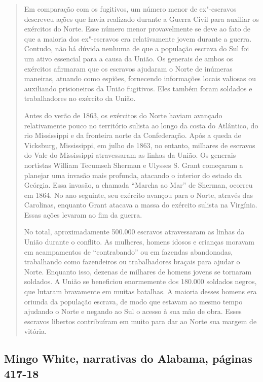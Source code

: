 \begin{quote}
Em comparação com os fugitivos, um número menor de ex"-escravos
descreveu ações que havia realizado durante a Guerra Civil para auxiliar
os exércitos do Norte. Esse número menor provavelmente se deve ao fato
de que a maioria dos ex"-escravos era relativamente jovem durante a
guerra. Contudo, não há dúvida nenhuma de que a população escrava do Sul
foi um ativo essencial para a causa da União. Os generais de ambos os
exércitos afirmaram que os escravos ajudaram o Norte de inúmeras
maneiras, atuando como espiões, fornecendo informações locais valiosas
ou auxiliando prisioneiros da União fugitivos. Eles também foram
soldados e trabalhadores no exército da União.

Antes do verão de 1863, os exércitos do Norte haviam avançado
relativamente pouco no território sulista ao longo da costa do
Atlântico, do rio Mississippi e da fronteira norte da Confederação. Após %
a queda de Vicksburg, Mississippi, em julho de 1863, no entanto, %
milhares de escravos do Vale do Mississippi atravessaram as linhas da %
União. Os generais nortistas William Tecumseh Sherman e Ulysses S. Grant
começaram a planejar uma invasão mais profunda, atacando o interior do
estado da Geórgia. Essa invasão, a chamada ``Marcha ao Mar'' de Sherman,
ocorreu em 1864. No ano seguinte, seu exército avançou para o Norte,
através das Carolinas, enquanto Grant atacava a massa do exército
sulista na Virgínia. Essas ações levaram ao fim da guerra.

No total, aproximadamente 500.000 escravos atravessaram as linhas
da União durante o conflito. As mulheres, homens idosos e crianças
moravam em acampamentos de ``contrabando'' ou em fazendas abandonadas,
trabalhando como fazendeiros ou trabalhadores braçais para ajudar o
Norte. Enquanto isso, dezenas de milhares de homens jovens se tornaram
soldados. A União se beneficiou enormemente dos 180.000 soldados negros,
que lutaram bravamente em muitas batalhas. A maioria desses homens era
oriunda da população escrava, de modo que estavam ao mesmo tempo
ajudando o Norte e negando ao Sul o acesso à sua mão de obra. Esses
escravos libertos contribuíram em muito para dar ao Norte sua margem de
vitória.
\end{quote}

\subsection{Mingo White, narrativas do Alabama, páginas 417-18}
\label{ref288}

